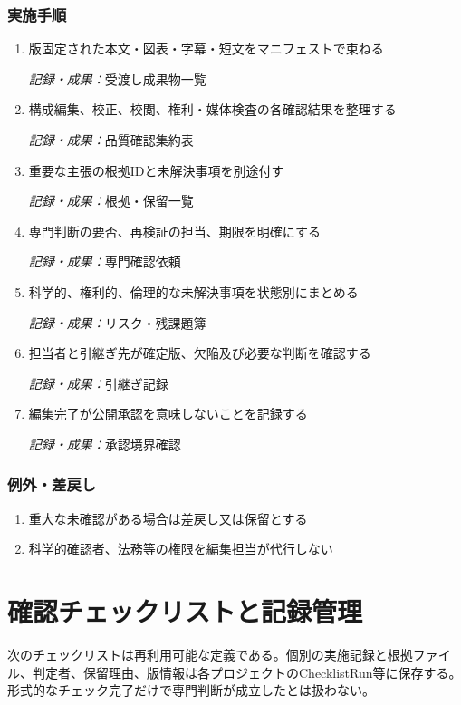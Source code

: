 \documentclass[a4paper,11pt]{article}
\begin{document}
\subsubsection*{実施手順}
\begin{enumerate}[leftmargin=2em,itemsep=0.65em]
\item 版固定された本文・図表・字幕・短文をマニフェストで束ねる\par\noindent\textit{記録・成果：}受渡し成果物一覧\nobreak\smallskip
\item 構成編集、校正、校閲、権利・媒体検査の各確認結果を整理する\par\noindent\textit{記録・成果：}品質確認集約表\nobreak\smallskip
\item 重要な主張の根拠IDと未解決事項を別途付す\par\noindent\textit{記録・成果：}根拠・保留一覧\nobreak\smallskip
\item 専門判断の要否、再検証の担当、期限を明確にする\par\noindent\textit{記録・成果：}専門確認依頼\nobreak\smallskip
\item 科学的、権利的、倫理的な未解決事項を状態別にまとめる\par\noindent\textit{記録・成果：}リスク・残課題簿\nobreak\smallskip
\item 担当者と引継ぎ先が確定版、欠陥及び必要な判断を確認する\par\noindent\textit{記録・成果：}引継ぎ記録\nobreak\smallskip
\item 編集完了が公開承認を意味しないことを記録する\par\noindent\textit{記録・成果：}承認境界確認\nobreak\smallskip
\end{enumerate}
\subsubsection*{例外・差戻し}
\begin{enumerate}[leftmargin=2em,itemsep=0.35em]
\item 重大な未確認がある場合は差戻し又は保留とする
\item 科学的確認者、法務等の権限を編集担当が代行しない
\end{enumerate}
\section{確認チェックリストと記録管理}
\par 次のチェックリストは再利用可能な定義である。個別の実施記録と根拠ファイル、判定者、保留理由、版情報は各プロジェクトのChecklistRun等に保存する。形式的なチェック完了だけで専門判断が成立したとは扱わない。\par\medskip
\end{document}
